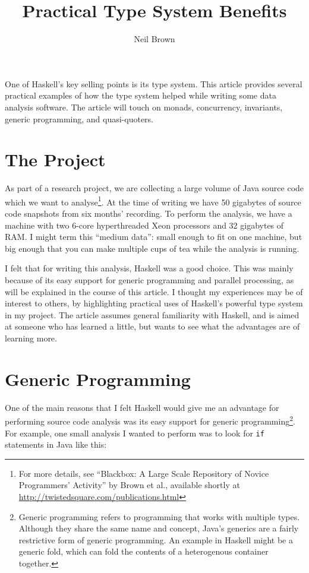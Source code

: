 \documentclass{tmr}
\title{Practical Type System Benefits}
\author{Neil Brown\email{neil@twistedsquare.com}}
\begin{document}
\begin{introduction} 
One of Haskell's key selling points is its type system.  This article provides several practical examples of how the type system helped while writing some data analysis software.  The article will touch on monads, concurrency, invariants, generic programming, and quasi-quoters.
\end{introduction}

\section{The Project}

As part of a research project, we are collecting a large volume of Java source code which we want to analyse\footnote{For more details, see ``Blackbox: A Large Scale Repository of Novice Programmers' Activity'' by Brown et al., available shortly at \url{http://twistedsquare.com/publications.html}}.  At the time of writing we have 50 gigabytes of source code snapshots from six months' recording.  To perform the analysis, we have a machine with two 6-core hyperthreaded Xeon processors and 32 gigabytes of RAM.  I might term this ``medium data'': small enough to fit on one machine, but big enough that you can make multiple cups of tea while the analysis is running.

I felt that for writing this analysis, Haskell was a good choice.  This was mainly because of its easy support for generic programming and parallel processing, as will be explained in the course of this article.  I thought my experiences may be of interest to others, by highlighting practical uses of Haskell's powerful type system in my project.  The article assumes general familiarity with Haskell, and is aimed at someone who has learned a little, but wants to see what the advantages are of learning more.


\section{Generic Programming}

One of the main reasons that I felt Haskell would give me an advantage for performing source code analysis was its easy support for generic programming\footnote{Generic programming refers to programming that works with multiple types.  Although they share the same name and concept, Java's generics are a fairly restrictive form of generic programming.  An example in Haskell might be a generic fold, which can fold the contents of a heterogenous container together.}. For example, one small analysis I wanted to perform was to look for \lstinline|if| statements in Java like this:
\end{document}
